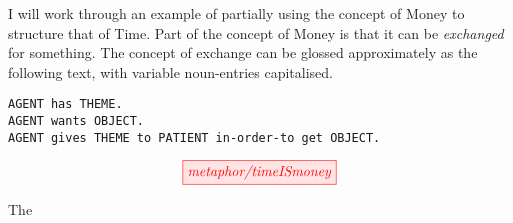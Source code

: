 I will work through an example of partially using the concept of Money to structure that of Time. Part of the concept of Money is that it can be \emph{exchanged} for something. The concept of exchange can be glossed approximately as the following text, with variable noun-entries capitalised.

\texttt{AGENT has THEME.}\\
\texttt{AGENT wants OBJECT.}\\
\texttt{AGENT gives THEME to PATIENT in-order-to get OBJECT.}

\[\tikzfig{metaphor/timeISmoney}\]

The 

\subsection{}